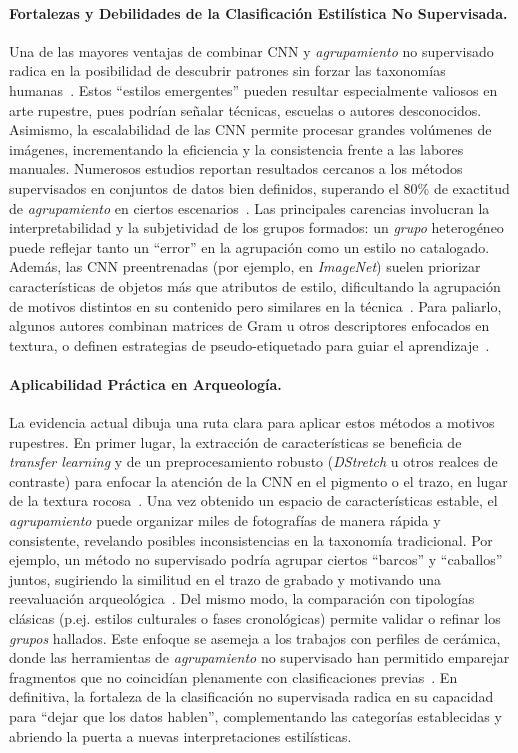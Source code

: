 \paragraph{Fortalezas y Debilidades de la Clasificación Estilística No Supervisada.}
Una de las mayores ventajas de combinar CNN y \textit{agrupamiento} no supervisado radica en la posibilidad de descubrir patrones sin forzar las taxonomías humanas~\cite{castellano2022,wynen2018}.
Estos “estilos emergentes” pueden resultar especialmente valiosos en arte rupestre, pues podrían señalar técnicas, escuelas o autores desconocidos. Asimismo, la escalabilidad de las CNN permite procesar grandes volúmenes de imágenes, incrementando la eficiencia y la consistencia frente a las labores manuales.
Numerosos estudios reportan resultados cercanos a los métodos supervisados en conjuntos de datos bien definidos, superando el 80\% de exactitud de \textit{agrupamiento} en ciertos escenarios~\cite{xue2023}.
Las principales carencias involucran la interpretabilidad y la subjetividad de los grupos formados: un \textit{grupo} heterogéneo puede reflejar tanto un “error” en la agrupación como un estilo no catalogado.
Además, las CNN preentrenadas (por ejemplo, en \textit{ImageNet}) suelen priorizar características de objetos más que atributos de estilo, dificultando la agrupación de motivos distintos en su contenido pero similares en la técnica~\cite{gairola2020}.
Para paliarlo, algunos autores combinan matrices de Gram u otros descriptores enfocados en textura, o definen estrategias de pseudo-etiquetado para guiar el aprendizaje~\cite{gairola2020,dangeti2024}.

\paragraph{Aplicabilidad Práctica en Arqueología.}
La evidencia actual dibuja una ruta clara para aplicar estos métodos a motivos rupestres.
En primer lugar, la extracción de características se beneficia de \textit{transfer learning} y de un preprocesamiento robusto (\textit{DStretch} u otros realces de contraste) para enfocar la atención de la CNN en el pigmento o el trazo, en lugar de la textura rocosa~\cite{guerin2018}.
Una vez obtenido un espacio de características estable, el \textit{agrupamiento} puede organizar miles de fotografías de manera rápida y consistente, revelando posibles inconsistencias en la taxonomía tradicional.
Por ejemplo, un método no supervisado podría agrupar ciertos “barcos” y “caballos” juntos, sugiriendo la similitud en el trazo de grabado y motivando una reevaluación arqueológica~\cite{gairola2020}.
Del mismo modo, la comparación con tipologías clásicas (p.ej. estilos culturales o fases cronológicas) permite validar o refinar los \textit{grupos} hallados.
Este enfoque se asemeja a los trabajos con perfiles de cerámica, donde las herramientas de \textit{agrupamiento} no supervisado han permitido emparejar fragmentos que no coincidían plenamente con clasificaciones previas~\cite{parisotto2022}.
En definitiva, la fortaleza de la clasificación no supervisada radica en su capacidad para “dejar que los datos hablen”, complementando las categorías establecidas y abriendo la puerta a nuevas interpretaciones estilísticas.

